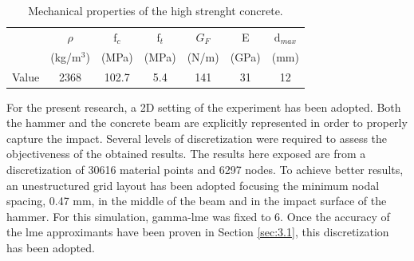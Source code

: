 \documentclass[preprint,12pt,a4paper]{elsarticle}
\begin{document}
\begin{table}
  \centering
  \begin{tabular}[]{c c c c c c c}
    \hline
      &   $\rho$   & $\text{f}_c$ & $\text{f}_t$ & $G_F$ &   E   & $\text{d}_{max}$ \\
      & (kg/m$^3$) &     (MPa)    &     (MPa)    & (N/m) & (GPa) & (mm) \\
    \hline
Value &    2368    &     102.7    &      5.4     &  141  &   31  &  12 \\
    \hline
  \end{tabular}
  \caption[Mechanical properties of thje concrete]{Mechanical
    properties of the high strenght concrete.}
  \label{tab:concrete-properties}
\end{table}
For the present research, a 2D setting of the experiment has been
adopted. Both the hammer and the concrete beam are explicitly
represented in order to properly capture the impact. Several levels of
discretization were required to assess the objectiveness of the
obtained results. The results here exposed are from a discretization
of 30616 material points and 6297 nodes. To achieve better results, an
unestructured grid layout has been adopted focusing the minimum nodal
spacing, 0.47 mm, in the middle of the beam and in the impact surface
of the hammer. For this simulation, \gls{gamma-lme} was fixed to
6. Once the accuracy of the \acrshort{lme} approximants have been
proven in Section \ref{sec:3.1}, this discretization has been adopted.
\end{document}
